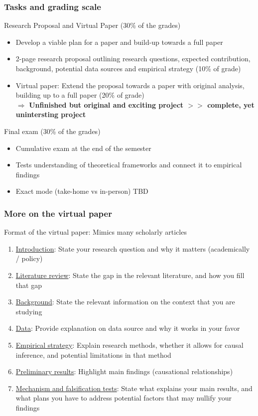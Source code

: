 \documentclass[aspectratio=169]{beamer}
\begin{document}
\begin{frame}
\frametitle{Tasks and grading scale} 

 Research Proposal and Virtual Paper (30\% of the grades)
\begin{itemize}\setlength\itemsep{3pt}
\item Develop a viable plan for a paper and build-up towards a full paper
\item 2-page research proposal outlining research questions, expected contribution, background, potential data sources and empirical strategy (10\% of grade)
\item Virtual paper: Extend the proposal towards a paper with original analysis, building up to a full paper (20\% of grade)\\ \smallskip
$\Rightarrow$ \textbf{Unfinished but original and exciting project $>>$ complete, yet unintersting project}
\end{itemize}\medskip
 Final exam (30\% of the grades) 
\begin{itemize}\setlength\itemsep{3pt}
\item Cumulative exam at the end of the semester
\item Tests understanding of theoretical frameworks and connect it to empirical findings
\item Exact mode (take-home vs in-person) TBD
\end{itemize}
\end{frame}
\begin{frame}
\frametitle{More on the virtual paper} 

Format of the virtual paper: Mimics many scholarly articles
\begin{enumerate}\setlength\itemsep{3pt}
\item \underline{Introduction}: State your research question and why it matters (academically / policy)
\item \underline{Literature review}: State the gap in the relevant literature, and how you fill that gap
\item \underline{Background}: State the relevant information on the context that you are studying
\item \underline{Data}: Provide explanation on data source and why it works in your favor
\item \underline{Empirical strategy}: Explain research methods, whether it allows for causal inference, and potential limitations in that method
\item \underline{Preliminary results}: Highlight main findings (causational relationships)
\item \underline{Mechanism and falsification tests}: State what explains your main results, and what plans you have to address potential factors that may nullify your findings
\end{enumerate}
\end{frame}
\end{document}
